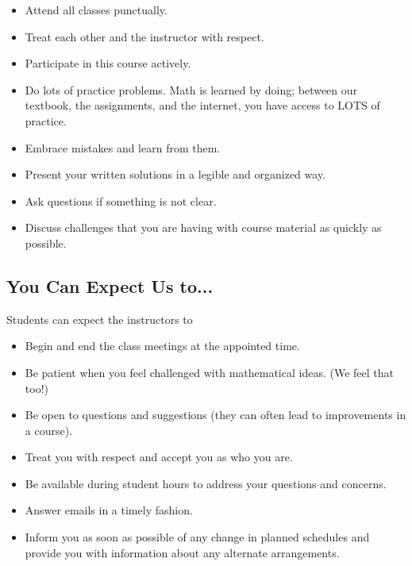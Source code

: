 \documentclass[12pt]{article}
\begin{document}
	\begin{itemize}
		\item Attend all classes punctually.
		\item Treat each other and the instructor with respect.
		\item Participate in this course actively. 
		\item Do lots of practice problems. Math is learned by doing; between our textbook, the assignments, and the internet, you have access to LOTS of practice.
        \item Embrace mistakes and learn from them.
		\item Present your written solutions in a legible and organized way.
		\item Ask questions if something is not clear. 	
		\item Discuss challenges that you are having with course material as quickly as possible.
	\end{itemize}
	
	\subsection{You Can Expect Us to...}
	
	Students can expect the instructors to
	\begin{itemize}
		\item Begin and end the class meetings at the appointed time.
		
		\item Be patient when you feel challenged with mathematical ideas. (We feel that too!)
		
		\item Be open to questions and suggestions (they can often lead to improvements in a course).
		
		\item Treat you with respect and accept you as who you are. 
		
		\item Be available during student hours to address your questions and concerns.
		
		\item Answer emails in a timely fashion.
		
		\item Inform you as soon as possible of any change in planned schedules and provide you with information about any alternate arrangements.
	\end{itemize}

\end{document}
